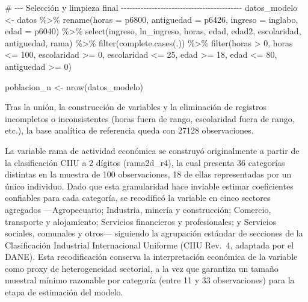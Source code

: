 \documentclass[
  spanish,
  letterpaper,
  DIV=11,
  numbers=noendperiod]{scrartcl}
\newenvironment{Shaded}{\begin{snugshade}}{\end{snugshade}}
\newcommand{\AttributeTok}[1]{\textcolor[rgb]{0.40,0.45,0.13}{#1}}
\newcommand{\CommentTok}[1]{\textcolor[rgb]{0.37,0.37,0.37}{#1}}
\newcommand{\DecValTok}[1]{\textcolor[rgb]{0.68,0.00,0.00}{#1}}
\newcommand{\FunctionTok}[1]{\textcolor[rgb]{0.28,0.35,0.67}{#1}}
\newcommand{\NormalTok}[1]{\textcolor[rgb]{0.00,0.23,0.31}{#1}}
\newcommand{\OtherTok}[1]{\textcolor[rgb]{0.00,0.23,0.31}{#1}}
\newcommand{\SpecialCharTok}[1]{\textcolor[rgb]{0.37,0.37,0.37}{#1}}
\begin{document}
\begin{Shaded}
\begin{Highlighting}[]
\CommentTok{\# {-}{-}{-} Selección y limpieza final {-}{-}{-}{-}{-}{-}{-}{-}{-}{-}{-}{-}{-}{-}{-}{-}{-}{-}{-}{-}{-}{-}{-}{-}{-}{-}{-}{-}{-}{-}{-}{-}{-}{-}{-}{-}{-}{-}{-}{-}{-}{-}{-}}
\NormalTok{datos\_modelo }\OtherTok{\textless{}{-}}\NormalTok{ datos }\SpecialCharTok{\%\textgreater{}\%}
  \FunctionTok{rename}\NormalTok{(}\AttributeTok{horas =}\NormalTok{ p6800, }\AttributeTok{antiguedad =}\NormalTok{ p6426, }\AttributeTok{ingreso =}\NormalTok{ inglabo, }\AttributeTok{edad =}\NormalTok{ p6040) }\SpecialCharTok{\%\textgreater{}\%}
  \FunctionTok{select}\NormalTok{(ingreso, ln\_ingreso, horas, edad, edad2, escolaridad,}
\NormalTok{         antiguedad, rama) }\SpecialCharTok{\%\textgreater{}\%}
  \FunctionTok{filter}\NormalTok{(}\FunctionTok{complete.cases}\NormalTok{(.)) }\SpecialCharTok{\%\textgreater{}\%}
  \FunctionTok{filter}\NormalTok{(horas }\SpecialCharTok{\textgreater{}} \DecValTok{0}\NormalTok{, horas }\SpecialCharTok{\textless{}=} \DecValTok{100}\NormalTok{,}
\NormalTok{         escolaridad }\SpecialCharTok{\textgreater{}=} \DecValTok{0}\NormalTok{, escolaridad }\SpecialCharTok{\textless{}=} \DecValTok{25}\NormalTok{,}
\NormalTok{         edad }\SpecialCharTok{\textgreater{}=} \DecValTok{18}\NormalTok{, edad }\SpecialCharTok{\textless{}=} \DecValTok{80}\NormalTok{,}
\NormalTok{         antiguedad }\SpecialCharTok{\textgreater{}=} \DecValTok{0}\NormalTok{)}

\NormalTok{poblacion\_n }\OtherTok{\textless{}{-}} \FunctionTok{nrow}\NormalTok{(datos\_modelo)}
\end{Highlighting}
\end{Shaded}

Tras la unión, la construcción de variables y la eliminación de
registros incompletos o inconsistentes (horas fuera de rango,
escolaridad fuera de rango, etc.), la base analítica de referencia queda
con 27128 observaciones.

La variable rama de actividad económica se construyó originalmente a
partir de la clasificación CIIU a 2 dígitos (rama2d\_r4), la cual
presenta 36 categorías distintas en la muestra de 100 observaciones, 18
de ellas representadas por un único individuo. Dado que esta
granularidad hace inviable estimar coeficientes confiables para cada
categoría, se recodificó la variable en cinco sectores agregados
---Agropecuario; Industria, minería y construcción; Comercio, transporte
y alojamiento; Servicios financieros y profesionales; y Servicios
sociales, comunales y otros--- siguiendo la agrupación estándar de
secciones de la Clasificación Industrial Internacional Uniforme (CIIU
Rev.~4, adaptada por el DANE). Esta recodificación conserva la
interpretación económica de la variable como proxy de heterogeneidad
sectorial, a la vez que garantiza un tamaño muestral mínimo razonable
por categoría (entre 11 y 33 observaciones) para la etapa de estimación
del modelo.
\end{document}
